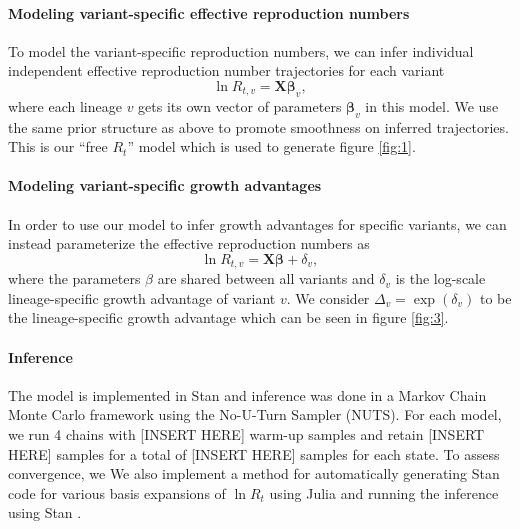 \documentclass[12pt]{article}
\renewcommand{\vec}[1]{\boldsymbol{#1}}
\begin{document}
\paragraph{Modeling variant-specific effective reproduction numbers}%

To model the variant-specific reproduction numbers, we can infer individual independent effective reproduction number trajectories for each variant
\begin{equation}
  \ln R_{t, v} = \vec{X} \vec{\beta}_{v},
\end{equation}
where each lineage $v$ gets its own vector of parameters $\vec{\beta}_{v}$ in this model.
We use the same prior structure as above to promote smoothness on inferred trajectories. This is our ``free $R_{t}$'' model which is used to generate figure \ref{fig:1}.

\paragraph{Modeling variant-specific growth advantages}%

In order to use our model to infer growth advantages for specific variants, we can instead parameterize the effective reproduction numbers as
\begin{equation}
\ln R_{t,v} = \vec{X} \vec{\beta} + \delta_{v},
\end{equation}
where the parameters $\beta$ are shared between all variants and $\delta_{v}$ is the log-scale lineage-specific growth advantage of variant $v$.
We consider $\Delta_{v} = \exp(\delta_{v})$ to be the lineage-specific growth advantage which can be seen in figure \ref{fig:3}.

\paragraph{Inference}

The model is implemented in Stan and inference was done in a Markov Chain Monte Carlo framework using the No-U-Turn Sampler (NUTS). \cites{carpenter2017stan, hoffman2011nouturn}
For each model, we run 4 chains with [INSERT HERE] warm-up samples and retain [INSERT HERE] samples for a total of [INSERT HERE] samples for each state.
To assess convergence, we
We also implement a method for automatically generating Stan code for various basis expansions of $\ln R_{t}$ using Julia and running the inference using Stan \cites{bezanson2017julia, carpenter2017stan}.
\end{document}
